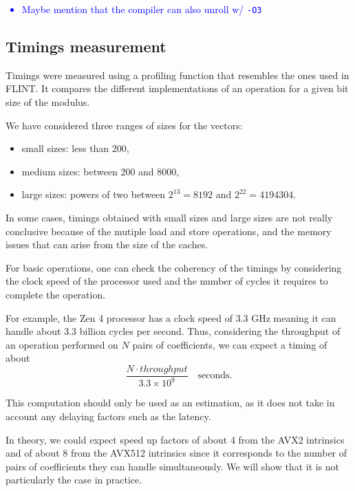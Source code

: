 \documentclass[a4paper]{article}
\begin{document}
\textcolor{blue}{
\begin{itemize}
    \item Maybe mention that the compiler can also unroll w/ \texttt{-O3}
\end{itemize}}

\subsection{Timings measurement}

Timings were measured using a profiling function that resembles the ones used in FLINT.
It compares the different implementations of an operation for a given bit size of the modulus.

\bigskip
We have considered three ranges of sizes for the vectors:
\begin{itemize}
    \item small sizes: less than 200, 
    \item medium sizes: between 200 and 8000,
    \item large sizes: powers of two between $2^{13}=8192$ and $2^{22}=4194304$.
\end{itemize}

In some cases, timings obtained with small sizes and large sizes are not really conclusive because of
the mutiple load and store operations, and the memory issues that can arise from the size of the caches.

\begin{remark}
    For basic operations, one can check the coherency of the timings by considering the clock speed of
    the processor used and the number of cycles it requires to complete the operation.
    
    For example, the Zen 4 processor has a clock speed of 3.3 GHz meaning it can handle about 
    3.3 billion cycles per second. Thus, considering the throughput of an operation performed on
    $N$ pairs of coefficients, we can expect a timing of about
    \[
    \dfrac{N\cdot throughput}{3.3\times 10^9}\quad \text{seconds}.
    \]

    This computation should only be used as an estimation, as it does not take in account any
    delaying factors such as the latency.
\end{remark}

\bigskip
In theory, we could expect speed up factors of about 4 from the AVX2 intrinsics and of about 8 from the AVX512 intrinsics
since it corresponds to the number of pairs of coefficients they can handle simultaneously.
We will show that it is not particularly the case in practice.
\end{document}
